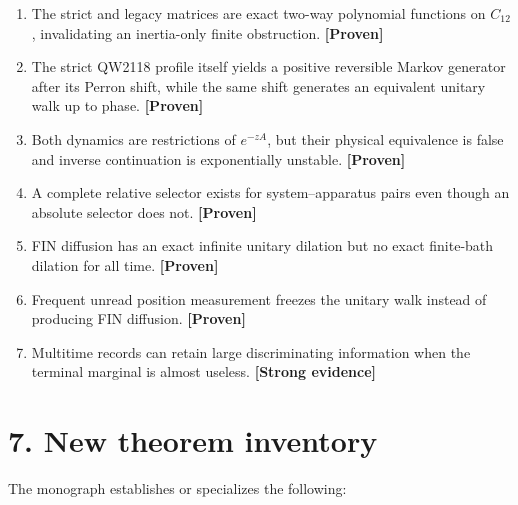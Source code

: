 \documentclass[11pt,a4paper,openany]{report}
\newcommand{\statusProven}{\textcolor{fingreen}{[Proven]}}
\newcommand{\statusStrong}{\textcolor{finblue}{[Strong evidence]}}
\begin{document}
\begin{enumerate}
\item 
The strict and legacy matrices are exact two-way polynomial functions on \(C_{12}\), invalidating an inertia-only finite obstruction. \textbf{\statusProven{}}

\item 
The strict QW2118 profile itself yields a positive reversible Markov generator after its Perron shift, while the same shift generates an equivalent unitary walk up to phase. \textbf{\statusProven{}}

\item 
Both dynamics are restrictions of \(e^{-zA}\), but their physical equivalence is false and inverse continuation is exponentially unstable. \textbf{\statusProven{}}

\item 
A complete relative selector exists for system–apparatus pairs even though an absolute selector does not. \textbf{\statusProven{}}

\item 
FIN diffusion has an exact infinite unitary dilation but no exact finite-bath dilation for all time. \textbf{\statusProven{}}

\item 
Frequent unread position measurement freezes the unitary walk instead of producing FIN diffusion. \textbf{\statusProven{}}

\item 
Multitime records can retain large discriminating information when the terminal marginal is almost useless. \textbf{\statusStrong{}}

\end{enumerate}

\section{7. New theorem inventory}

The monograph establishes or specializes the following:
\end{document}
